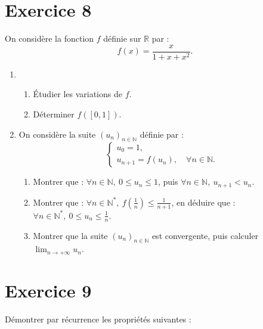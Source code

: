 \documentclass[12pt]{article}
\begin{document}
\section*{Exercice 8}

On considère la fonction \(f\) définie sur \(\mathbb{R}\) par :
\[
f(x) = \frac{x}{1 + x + x^2}.
\]

\begin{enumerate}
    \item 
    \begin{enumerate}
        \item Étudier les variations de \(f\).
        \item Déterminer \(f([0,1])\).
    \end{enumerate}
    \item On considère la suite \((u_n)_{n \in \mathbb{N}}\) définie par :
    \[
    \begin{cases}
    u_0 = 1, \\
    u_{n+1} = f(u_n), \quad \forall n \in \mathbb{N}.
    \end{cases}
    \]
    \begin{enumerate}
        \item Montrer que : \(\forall n \in \mathbb{N}, \ 0 \leq u_n \leq 1\), puis \(\forall n \in \mathbb{N}, \ u_{n+1} < u_n\).
        \item Montrer que : \(\forall n \in \mathbb{N}^*, \ f\left(\frac{1}{n}\right) \leq \frac{1}{n+1}\), en déduire que : \(\forall n \in \mathbb{N}^*, \ 0 \leq u_n \leq \frac{1}{n}\).
        \item Montrer que la suite \((u_n)_{n \in \mathbb{N}}\) est convergente, puis calculer \(\lim_{n \to +\infty} u_n\).
    \end{enumerate}
\end{enumerate}

\section*{Exercice 9}

Démontrer par récurrence les propriétés suivantes :
\end{document}
